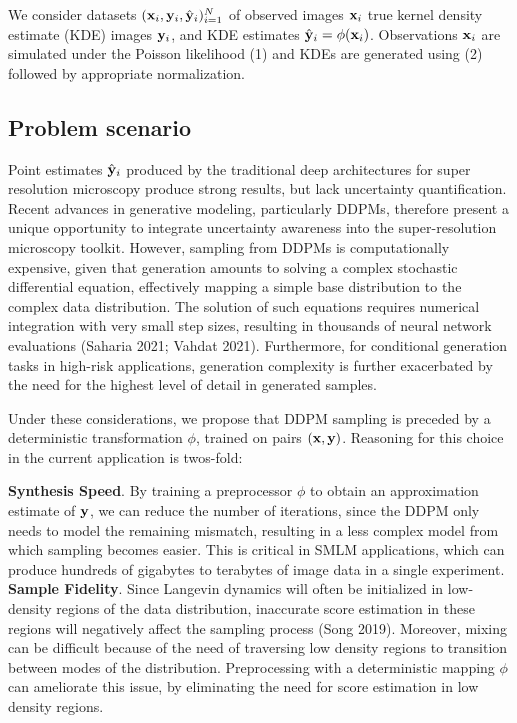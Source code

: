 \documentclass{article}
\begin{document}
We consider datasets $(\bold{x}_i,\bold{y}_i,\hat{\bold{y}}_{i})_{i=1}^{N}$ of observed images $\bold{x}_i$ true kernel density estimate (KDE) images $\bold{y}_{i}$, and KDE estimates $\hat{\bold{y}}_{i}=\phi(\bold{x}_{i})$. Observations $\bold{x}_i$ are simulated under the Poisson likelihood (1) and KDEs are generated using (2) followed by appropriate normalization. 

\subsection{Problem scenario}

Point estimates $\hat{\bold{y}}_{i}$ produced by the traditional deep architectures for super resolution microscopy produce strong results, but lack uncertainty quantification. Recent advances in generative modeling, particularly DDPMs, therefore present a unique opportunity to integrate uncertainty awareness into the super-resolution microscopy toolkit. However, sampling from DDPMs is computationally expensive, given that generation amounts to solving a complex stochastic differential equation, effectively mapping a simple base distribution to the complex data distribution. The solution of such equations requires numerical integration with very small step sizes, resulting in thousands of neural network evaluations (Saharia 2021; Vahdat 2021). Furthermore, for conditional generation tasks in high-risk applications, generation complexity is further exacerbated by the need for the highest level of detail in generated samples.

Under these considerations, we propose that DDPM sampling is preceded by a deterministic transformation $\phi$, trained on pairs $(\bold{x},\bold{y})$. Reasoning for this choice in the current application is twos-fold:

\textbf{Synthesis Speed}. By training a preprocessor $\phi$ to obtain an approximation estimate of $\bold{y}$, we can reduce the number of iterations, since the DDPM only needs to model the remaining mismatch, resulting in a less complex model from which sampling becomes easier. This is critical in SMLM applications, which can produce hundreds of gigabytes to terabytes of image data in a single experiment. \\

\textbf{Sample Fidelity}. Since Langevin dynamics will often be initialized in low-density regions of the data distribution, inaccurate score estimation in these regions will negatively affect the sampling
process (Song 2019). Moreover, mixing can be difficult because of the need of traversing low density regions to transition between modes of the distribution. Preprocessing with a deterministic mapping $\phi$ can ameliorate this issue, by eliminating the need for score estimation in low density regions. 
\end{document}
